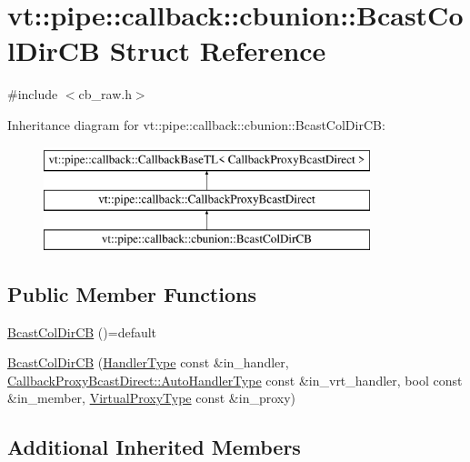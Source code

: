 \hypertarget{structvt_1_1pipe_1_1callback_1_1cbunion_1_1_bcast_col_dir_c_b}{}\section{vt\+:\+:pipe\+:\+:callback\+:\+:cbunion\+:\+:Bcast\+Col\+Dir\+CB Struct Reference}
\label{structvt_1_1pipe_1_1callback_1_1cbunion_1_1_bcast_col_dir_c_b}


{\ttfamily \#include $<$cb\+\_\+raw.\+h$>$}

Inheritance diagram for vt\+:\+:pipe\+:\+:callback\+:\+:cbunion\+:\+:Bcast\+Col\+Dir\+CB\+:\begin{figure}[H]
\begin{center}
\leavevmode
\includegraphics[height=3.000000cm]{structvt_1_1pipe_1_1callback_1_1cbunion_1_1_bcast_col_dir_c_b}
\end{center}
\end{figure}
\subsection*{Public Member Functions}
\begin{DoxyCompactItemize}
\item 
\hyperlink{structvt_1_1pipe_1_1callback_1_1cbunion_1_1_bcast_col_dir_c_b_a38d5f3f68d4ca7752835cae912d4f3a7}{Bcast\+Col\+Dir\+CB} ()=default
\item 
\hyperlink{structvt_1_1pipe_1_1callback_1_1cbunion_1_1_bcast_col_dir_c_b_aa10324976fb406cc31bee9625f70dad7}{Bcast\+Col\+Dir\+CB} (\hyperlink{namespacevt_af64846b57dfcaf104da3ef6967917573}{Handler\+Type} const \&in\+\_\+handler, \hyperlink{structvt_1_1pipe_1_1callback_1_1_callback_proxy_bcast_direct_a543cd86434430bd048952534f4fbc128}{Callback\+Proxy\+Bcast\+Direct\+::\+Auto\+Handler\+Type} const \&in\+\_\+vrt\+\_\+handler, bool const \&in\+\_\+member, \hyperlink{namespacevt_a1b417dd5d684f045bb58a0ede70045ac}{Virtual\+Proxy\+Type} const \&in\+\_\+proxy)
\end{DoxyCompactItemize}
\subsection*{Additional Inherited Members}


